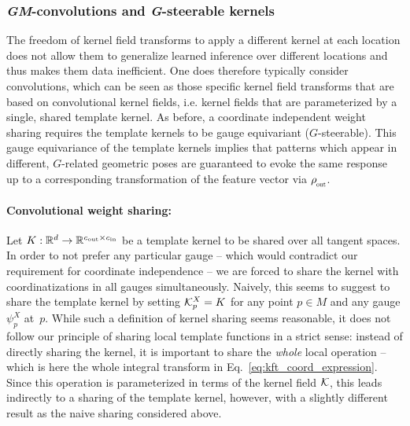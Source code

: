 \subsubsection{\textit{GM}-convolutions and \textit{G}-steerable kernels}
\label{sec:gauge_conv}

The freedom of kernel field transforms to apply a different kernel at each location does not allow them to generalize learned inference over different locations and thus makes them data inefficient.
One does therefore typically consider convolutions, which can be seen as those specific kernel field transforms that are based on convolutional kernel fields, i.e. kernel fields that are parameterized by a single, shared template kernel.
As before, a coordinate independent weight sharing requires the template kernels to be gauge equivariant ($G$-steerable).
This gauge equivariance of the template kernels implies that patterns which appear in different, $G$-related geometric poses are guaranteed to evoke the same response up to a corresponding transformation of the feature vector via $\rhoout$.


\paragraph{Convolutional weight sharing:}
Let $K: \mathbb{R}^d \to \mathbb{R}^{{c_\textup{out}}\times{c_\textup{in}}}$ be a template kernel to be shared over all tangent spaces.
In order to not prefer any particular gauge -- which would contradict our requirement for coordinate independence -- we are forced to share the kernel with coordinatizations in all gauges simultaneously.
Naively, this seems to suggest to share the template kernel by setting $\mathcal{K}_p^X = K$ for any point $p\in M$ and any gauge $\psi_p^X$ at~$p$.
While such a definition of kernel sharing seems reasonable, it does not follow our principle of sharing local template functions in a strict sense:
instead of directly sharing the kernel, it is important to share the \emph{whole} local operation -- which is here the whole 
integral transform in Eq.~\eqref{eq:kft_coord_expression}.
Since this operation is parameterized in terms of the kernel field $\mathcal{K}$, this leads indirectly to a sharing of the template kernel, however, with a slightly different result as the naive sharing considered above.

